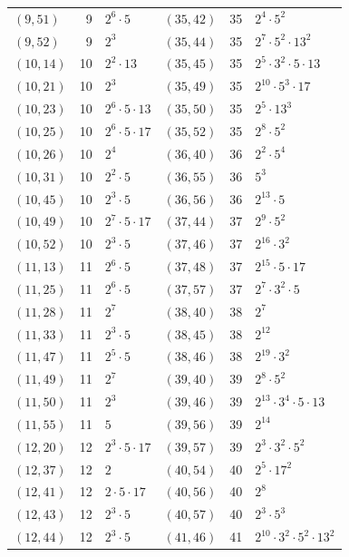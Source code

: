 \documentclass[11pt]{article}
\begin{document}
\begin{longtable}{@{}lrl@{\qquad}lrl@{}}
$(9,51)$ & 9 & $2^{6}\cdot 5$ & $(35,42)$ & 35 & $2^{4}\cdot 5^{2}$\\
$(9,52)$ & 9 & $2^{3}$ & $(35,44)$ & 35 & $2^{7}\cdot 5^{2}\cdot 13^{2}$\\
$(10,14)$ & 10 & $2^{2}\cdot 13$ & $(35,45)$ & 35 & $2^{5}\cdot 3^{2}\cdot 5\cdot 13$\\
$(10,21)$ & 10 & $2^{3}$ & $(35,49)$ & 35 & $2^{10}\cdot 5^{3}\cdot 17$\\
$(10,23)$ & 10 & $2^{6}\cdot 5\cdot 13$ & $(35,50)$ & 35 & $2^{5}\cdot 13^{3}$\\
$(10,25)$ & 10 & $2^{6}\cdot 5\cdot 17$ & $(35,52)$ & 35 & $2^{8}\cdot 5^{2}$\\
$(10,26)$ & 10 & $2^{4}$ & $(36,40)$ & 36 & $2^{2}\cdot 5^{4}$\\
$(10,31)$ & 10 & $2^{2}\cdot 5$ & $(36,55)$ & 36 & $5^{3}$\\
$(10,45)$ & 10 & $2^{3}\cdot 5$ & $(36,56)$ & 36 & $2^{13}\cdot 5$\\
$(10,49)$ & 10 & $2^{7}\cdot 5\cdot 17$ & $(37,44)$ & 37 & $2^{9}\cdot 5^{2}$\\
$(10,52)$ & 10 & $2^{3}\cdot 5$ & $(37,46)$ & 37 & $2^{16}\cdot 3^{2}$\\
$(11,13)$ & 11 & $2^{6}\cdot 5$ & $(37,48)$ & 37 & $2^{15}\cdot 5\cdot 17$\\
$(11,25)$ & 11 & $2^{6}\cdot 5$ & $(37,57)$ & 37 & $2^{7}\cdot 3^{2}\cdot 5$\\
$(11,28)$ & 11 & $2^{7}$ & $(38,40)$ & 38 & $2^{7}$\\
$(11,33)$ & 11 & $2^{3}\cdot 5$ & $(38,45)$ & 38 & $2^{12}$\\
$(11,47)$ & 11 & $2^{5}\cdot 5$ & $(38,46)$ & 38 & $2^{19}\cdot 3^{2}$\\
$(11,49)$ & 11 & $2^{7}$ & $(39,40)$ & 39 & $2^{8}\cdot 5^{2}$\\
$(11,50)$ & 11 & $2^{3}$ & $(39,46)$ & 39 & $2^{13}\cdot 3^{4}\cdot 5\cdot 13$\\
$(11,55)$ & 11 & $5$ & $(39,56)$ & 39 & $2^{14}$\\
$(12,20)$ & 12 & $2^{3}\cdot 5\cdot 17$ & $(39,57)$ & 39 & $2^{3}\cdot 3^{2}\cdot 5^{2}$\\
$(12,37)$ & 12 & $2$ & $(40,54)$ & 40 & $2^{5}\cdot 17^{2}$\\
$(12,41)$ & 12 & $2\cdot 5\cdot 17$ & $(40,56)$ & 40 & $2^{8}$\\
$(12,43)$ & 12 & $2^{3}\cdot 5$ & $(40,57)$ & 40 & $2^{3}\cdot 5^{3}$\\
$(12,44)$ & 12 & $2^{3}\cdot 5$ & $(41,46)$ & 41 & $2^{10}\cdot 3^{2}\cdot 5^{2}\cdot 13^{2}$\\

\end{longtable}
\end{document}
